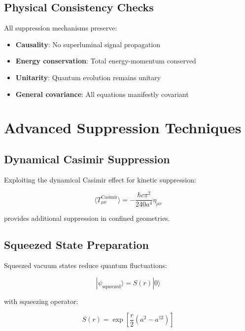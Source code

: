 \documentclass[12pt,a4paper]{article}
\begin{document}
\subsection{Physical Consistency Checks}

All suppression mechanisms preserve:

\begin{itemize}
\item \textbf{Causality}: No superluminal signal propagation
\item \textbf{Energy conservation}: Total energy-momentum conserved
\item \textbf{Unitarity}: Quantum evolution remains unitary
\item \textbf{General covariance}: All equations manifestly covariant
\end{itemize}

\section{Advanced Suppression Techniques}

\subsection{Dynamical Casimir Suppression}

Exploiting the dynamical Casimir effect for kinetic suppression:

\begin{equation}
\langle T_{\mu\nu}^{\text{Casimir}}\rangle = -\frac{\hbar c \pi^2}{240 a^4} \eta_{\mu\nu}
\end{equation}

provides additional suppression in confined geometries.

\subsection{Squeezed State Preparation}

Squeezed vacuum states reduce quantum fluctuations:

\begin{equation}
|\psi_{\text{squeezed}}\rangle = S(r) |0\rangle
\end{equation}

with squeezing operator:

\begin{equation}
S(r) = \exp\left[\frac{r}{2}(a^2 - a^{\dagger 2})\right]
\end{equation}
\end{document}
